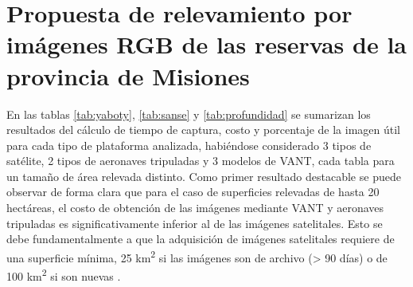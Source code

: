 

\color{black} 
\section {Propuesta de relevamiento por imágenes RGB de las reservas de la provincia de Misiones} \label{resultados bloque 1}


En las tablas \ref{tab:yaboty}, \ref{tab:sanse} y \ref{tab:profundidad} se sumarizan los resultados del cálculo de tiempo de captura, costo y porcentaje de la imagen útil para cada tipo de plataforma analizada, habiéndose considerado 3 tipos de satélite, 2 tipos de aeronaves tripuladas y 3 modelos de VANT, cada tabla para un tamaño de área relevada distinto. Como primer resultado destacable se puede observar de forma clara que para el caso de superficies relevadas de hasta 20 hectáreas, el costo de obtención de las imágenes mediante VANT y aeronaves tripuladas es significativamente inferior al de las imágenes satelitales. Esto se debe fundamentalmente a que la adquisición de imágenes satelitales requiere de una superficie mínima, 25 km\textsuperscript{2} si las imágenes son de archivo (> 90 días) o de 100 km\textsuperscript{2} si son nuevas \cite{noauthor_satellite_2020}.

